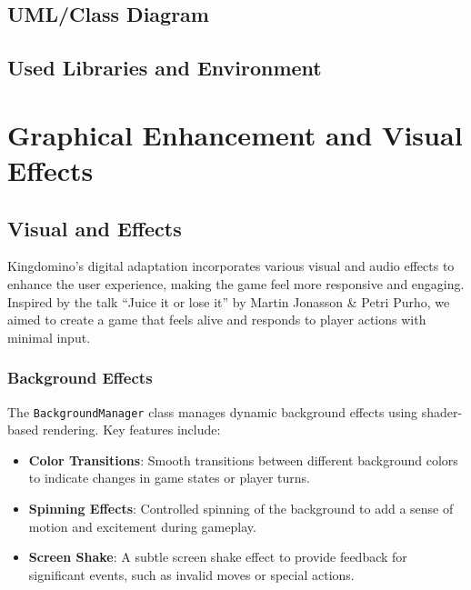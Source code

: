 \documentclass[conference]{IEEEtran}
\begin{document}
\subsection{UML/Class Diagram}

\subsection{Used Libraries and Environment}


\section{Graphical Enhancement and Visual Effects}
\label{sec:graphical_enhancement}

\subsection{Visual and Effects}
Kingdomino's digital adaptation incorporates various visual and audio effects
to enhance the user experience, making the game feel more responsive and
engaging. Inspired by the talk ``Juice it or lose it'' by Martin Jonasson \&
Petri Purho, we aimed to create a game that feels alive and responds to player
actions with minimal input.

\subsubsection{Background Effects}
The \texttt{BackgroundManager} class manages dynamic background effects using
shader-based rendering. Key features include:
\begin{itemize}
    \item \textbf{Color Transitions}: Smooth transitions between different background colors to indicate changes in game states or player turns.
    \item \textbf{Spinning Effects}: Controlled spinning of the background to add a sense of motion and excitement during gameplay.
    \item \textbf{Screen Shake}: A subtle screen shake effect to provide feedback for significant events, such as invalid moves or special actions.
\end{itemize}
\end{document}
